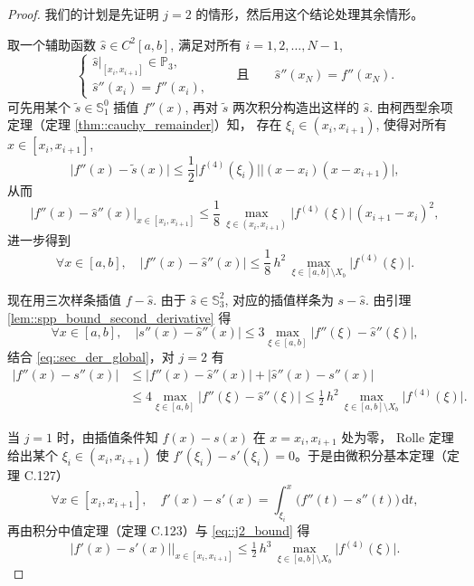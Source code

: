 \documentclass[a4paper]{ctexart}
\numberwithin{theorem}{section}
\numberwithin{equation}{section}
\numberwithin{figure}{section}
\numberwithin{remark}{section}
\begin{document}
\begin{proof}
我们的计划是先证明 $j=2$ 的情形，然后用这个结论处理其余情形。

取一个辅助函数 $\hat{s}\in C^{2}[a,b]$, 满足对所有 $i=1,2,\ldots,N-1$,
\[
\begin{cases}
\hat{s}\big|_{[x_i,x_{i+1}]}\in\mathbb{P}_3,\\[2pt]
\hat{s}''(x_i)=f''(x_i),
\end{cases}
\qquad\text{且}\qquad
\hat{s}''(x_N)=f''(x_N).
\]
可先用某个 $\tilde{s}\in\mathbb{S}_1^{0}$ 插值 $f''(x)$, 
再对 $\tilde{s}$ 两次积分构造出这样的 $\hat{s}$. 
由柯西型余项定理（定理 \ref{thm::cauchy_remainder}）知，
存在 $\xi_i\in(x_i,x_{i+1})$, 使得对所有 $x\in[x_i,x_{i+1}]$,
\[
\bigl|f''(x)-\tilde{s}(x)
\bigr|\le \frac{1}{2}
\bigl|f^{(4)}(\xi_i)\bigr|
\bigl|(x-x_i)(x-x_{i+1})\bigr|,
\]
从而
\begin{equation*}
\bigl|f''(x)-\hat{s}''(x)\bigr|_{x\in[x_i,x_{i+1}]}
\le \frac{1}{8}\,\max_{\xi\in(x_i,x_{i+1})}\bigl|f^{(4)}(\xi)\bigr|\, (x_{i+1}-x_i)^2,
\end{equation*}
进一步得到
\begin{equation}
\label{eq::sec_der_global}
\forall x\in[a,b],\quad
\bigl|f''(x)-\hat{s}''(x)\bigr|\le
\frac{1}{8}\,h^{2}\,
\max_{\xi\in[a,b]\setminus X_b}\bigl|f^{(4)}(\xi)\bigr|.
\end{equation}

现在用三次样条插值 $f-\hat{s}$. 
由于 $\hat{s}\in\mathbb{S}_3^{2}$, 对应的插值样条为 $s-\hat{s}$. 
由引理 \ref{lem::spp_bound_second_derivative} 得
\[
\forall x\in[a,b],\quad
\bigl|s''(x)-\hat{s}''(x)\bigr|
\le 3\max_{\xi\in[a,b]}\bigl|f''(\xi)-\hat{s}''(\xi)\bigr|,
\]
结合 \eqref{eq::sec_der_global}，对 $j=2$ 有
\begin{align}
\bigl|f''(x)-s''(x)\bigr|
&\le \bigl|f''(x)-\hat{s}''(x)\bigr|+\bigl|\hat{s}''(x)-s''(x)\bigr| \nonumber\\
&\le 4\max_{\xi\in[a,b]}\bigl|f''(\xi)-\hat{s}''(\xi)\bigr|
\le \frac{1}{2}\,h^{2}\,\max_{\xi\in[a,b]\setminus X_b}\bigl|f^{(4)}(\xi)\bigr|.
\label{eq::j2_bound}
\end{align}

当 $j=1$ 时，由插值条件知 $f(x)-s(x)$ 在 $x=x_i,x_{i+1}$ 处为零，
Rolle 定理给出某个 $\xi_i\in(x_i,x_{i+1})$ 使
$f'(\xi_i)-s'(\xi_i)=0$。于是由微积分基本定理（定理 C.127）
\[
\forall x\in[x_i,x_{i+1}],\quad
f'(x)-s'(x)=\int_{\xi_i}^{x}\bigl(f''(t)-s''(t)\bigr)\,\mathrm{d}t,
\]
再由积分中值定理（定理 C.123）与 \eqref{eq::j2_bound} 得
\begin{equation*}
\bigl|f'(x)-s'(x)\bigr|\big|_{x\in[x_i,x_{i+1}]}
\le \tfrac{1}{2}\,h^{3}\,
\max_{\xi\in[a,b]\setminus X_b}\bigl|f^{(4)}(\xi)\bigr|.
\end{equation*}


\end{proof}
\end{document}
